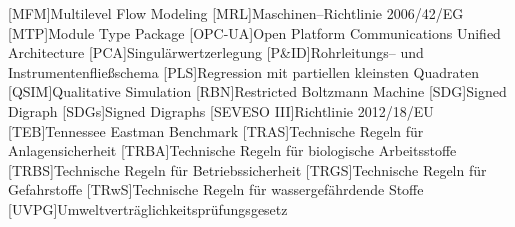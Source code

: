\begin{acronym}[12. BImSchV]
  [MFM]{Multilevel Flow Modeling}
  [MRL]{Maschinen--Richtlinie 2006/42/EG}	
  [MTP]{Module Type Package}	
  [OPC-UA]{Open Platform Communications Unified Architecture}
  [PCA]{Singul\"arwertzerlegung }
	[P\&{}ID]{Rohrleitungs-- und Instrumentenflie\ss{}schema }	
	[PLS]{Regression mit partiellen kleinsten Quadraten }	
	[QSIM]{Qualitative Simulation }
	[RBN]{Restricted Boltzmann Machine}
	[SDG]{Signed Digraph}
	[SDGs]{Signed Digraphs}
	[SEVESO III]{Richtlinie 2012/18/EU}
	[TEB]{Tennessee Eastman Benchmark}
	[TRAS]{Technische Regeln f\"ur Anlagensicherheit}
	[TRBA]{Technische Regeln f\"ur biologische Arbeitsstoffe}
	[TRBS]{Technische Regeln f\"ur Betriebssicherheit}
	[TRGS]{Technische Regeln f\"ur Gefahrstoffe}
	[TRwS]{Technische Regeln f\"ur wassergef\"ahrdende Stoffe}
	[UVPG]{Umweltvertr\"aglichkeitspr\"ufungsgesetz}
\end{acronym}